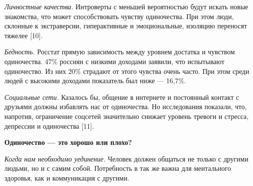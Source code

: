 \textit{Личностные качества.}
Интроверты с меньшей вероятностью будут искать новые знакомства,
что может способствовать чувству одиночества.
При этом люди, склонные к экстраверсии, гиперактивные и эмоциональные,
изоляцию переносят тяжелее [10].


\textit{Бедность.}
Росстат  прямую зависимость между уровнем
достатка и чувством одиночества. 47\% россиян с низкими доходами
заявили, что испытывают одиночество.
Из них 20\% страдают от этого чувства очень часто.
При этом среди людей с высокими доходами показатель был ниже --- 16,7\%.

\textit{Социальные сети.}
Казалось бы, общение в интернете и постоянный контакт с друзьями
должны избавлять нас от одиночества. Но исследования показали, что,
напротив, ограничение соцсетей значительно снижает уровень тревоги
и стресса, депрессии и одиночества [11].

\textbf{Одиночество — это хорошо или плохо?}

\textit{Когда нам необходимо уединение.}
Человек должен общаться не только с другими людьми, но
и с самим собой.
Потребность в 
так же важна для ментального здоровья,
как и коммуникация с другими.




